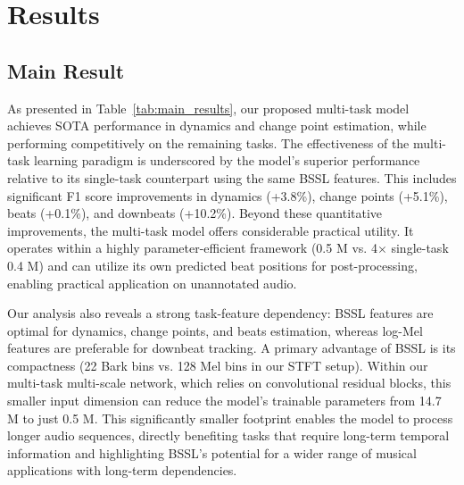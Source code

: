 \documentclass{article}
\begin{document}
\section{Results}
\label{sec:results}
\subsection{Main Result}
As presented in Table~\ref{tab:main_results}, our proposed multi-task model achieves SOTA performance in dynamics and change point estimation, while performing competitively on the remaining tasks. The effectiveness of the multi-task learning paradigm is underscored by the model's superior performance relative to its single-task counterpart using the same BSSL features. This includes significant F1 score improvements in dynamics (+3.8\%), change points (+5.1\%), beats (+0.1\%), and downbeats (+10.2\%). Beyond these quantitative improvements, the multi-task model offers considerable practical utility. It operates within a highly parameter-efficient framework (0.5 M vs. 4$\times$ single-task 0.4 M) and can utilize its own predicted beat positions for post-processing, enabling practical application on unannotated audio.

Our analysis also reveals a strong task-feature dependency: BSSL features are optimal for dynamics, change points, and beats estimation, whereas log-Mel features are preferable for downbeat tracking. A primary advantage of BSSL is its compactness (22 Bark bins vs. 128 Mel bins in our STFT setup). Within our multi-task multi-scale network, which relies on convolutional residual blocks, this smaller input dimension can reduce the model's trainable parameters from 14.7 M to just 0.5 M. This significantly smaller footprint enables the model to process longer audio sequences, directly benefiting tasks that require long-term temporal information and highlighting BSSL's potential for a wider range of musical applications with long-term dependencies.
\end{document}
